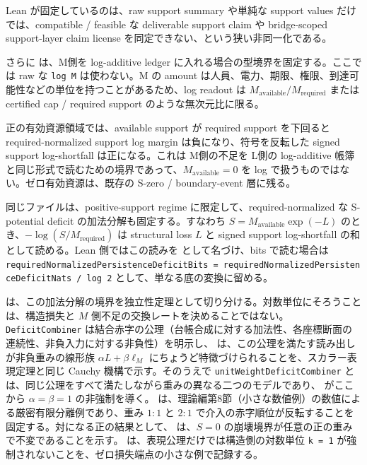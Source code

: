 \documentclass[12pt,a4paper]{article}
\begin{document}
Lean が固定しているのは、raw support summary や単純な support values だけでは、compatible / feasible な deliverable support claim や bridge-scoped support-layer claim license を同定できない、という狭い非同一化である。

さらに {\scriptsize{}} は、M側を log-additive ledger に入れる場合の型境界を固定する。ここでは raw な \texttt{log\ M} は使わない。M の amount は人員、電力、期限、権限、到達可能性などの単位を持つことがあるため、log readout は \(M_{\mathrm{available}}/M_{\mathrm{required}}\) または certified cap / required support のような無次元比に限る。

正の有効資源領域では、available support が required support を下回ると required-normalized support log margin は負になり、符号を反転した signed support log-shortfall は正になる。これは M側の不足を L側の log-additive 帳簿と同じ形式で読むための境界であって、\(M_{\mathrm{available}}=0\) を log で扱うものではない。ゼロ有効資源は、既存の S-zero / boundary-event 層に残る。

同じファイルは、positive-support regime に限定して、required-normalized な S-potential deficit の加法分解も固定する。すなわち \(S=M_{\mathrm{available}}\exp(-L)\) のとき、\(-\log(S/M_{\mathrm{required}})\) は structural loss \(L\) と signed support log-shortfall の和として読める。Lean 側ではこの読みを {\scriptsize{}} として名づけ、bits で読む場合は \texttt{requiredNormalizedPersistenceDeficitBits\ =\ requiredNormalizedPersistenceDeficitNats\ /\ log\ 2} として、単なる底の変換に留める。

{\scriptsize{}} は、この加法分解の境界を独立性定理として切り分ける。対数単位にそろうことは、構造損失と \(M\) 側不足の交換レートを決めることではない。\texttt{DeficitCombiner} は結合赤字の公理（台帳合成に対する加法性、各座標断面の連続性、非負入力に対する非負性）を明示し、{\scriptsize{}} は、この公理を満たす読み出しが非負重みの線形族 \(\alpha L+\beta\ell_M\) にちょうど特徴づけられることを、スカラー表現定理と同じ Cauchy 機構で示す。そのうえで \texttt{unitWeightDeficitCombiner} と {\scriptsize{}} は、同じ公理をすべて満たしながら重みの異なる二つのモデルであり、{\scriptsize{}} がここから \(\alpha=\beta=1\) の非強制を導く。{\scriptsize{}} は、理論編第8節（小さな数値例）の数値による厳密有限分離例であり、重み \(1:1\) と \(2:1\) で介入の赤字順位が反転することを固定する。対になる正の結果として、{\scriptsize{}} は、\(S=0\) の崩壊境界が任意の正の重みで不変であることを示す。{\scriptsize{}} は、表現公理だけでは構造側の対数単位 \texttt{k\ =\ 1} が強制されないことを、ゼロ損失端点の小さな例で記録する。
\end{document}
